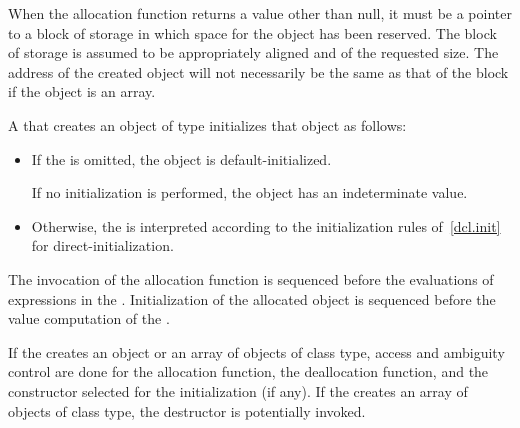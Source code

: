 \pnum
\begin{note}
When the allocation function returns a value other than null, it must be
a pointer to a block of storage in which space for the object has been
reserved. The block of storage is assumed to be
appropriately aligned
and of the requested size. The address of the created object will not
necessarily be the same as that of the block if the object is an array.
\end{note}

\pnum
{}%
%
%
%
A  that creates an object of type 
initializes that object as follows:

\begin{itemize}
\item If the  is omitted, the object is
default-initialized.
\begin{note}
If no initialization
is performed, the object has an indeterminate value.
\end{note}

\item Otherwise, the  is interpreted according to
the initialization rules of~\ref{dcl.init} for direct-initialization.
\end{itemize}

\pnum
{}%
%
The invocation of the allocation function is sequenced before
the evaluations of expressions in the . Initialization of
the allocated object is sequenced before the
%
value computation of the
.

\pnum
If the  creates an object or an array of
objects of class type, access and ambiguity control are done for the
allocation function, the deallocation function, and
the constructor selected for the initialization (if any).
If the 
creates an array of objects of class type, the destructor is potentially
invoked.

